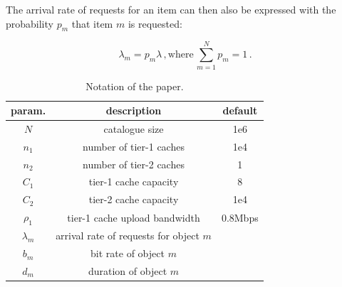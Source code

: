 The arrival rate of requests for an item can then also be expressed with the probability $p_m$ that item $m$ is requested:

\begin{equation}
\lambda_m = p_m \lambda \, , \text{where} \, \sum_{m=1}^N p_m = 1 \, .
\end{equation}



\begin{table}[tb]
\centering
\caption{Notation of the paper.}
\label{tab:notation}
\begin{tabular}{|c|c|c|}
\hline
param. & description & default \\
\hline
$N$ & catalogue size & 1e6 \\
$n_{1}$ & number of tier-1 caches & 1e4 \\
$n_{2}$ & number of tier-2 caches & 1 \\
$C_{1}$ & tier-1 cache capacity & 8 \\
$C_{2}$ & tier-2 cache capacity & 1e4 \\
$\rho_{1}$ & tier-1 cache upload bandwidth & 0.8Mbps \\
$\lambda_m$ & arrival rate of requests for object $m$& \\
$b_m$ & bit rate of object $m$& \\
$d_m$ & duration of object $m$& \\
\hline
\end{tabular}
\end{table}


